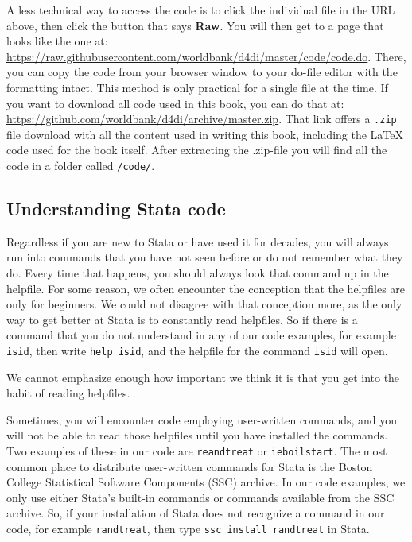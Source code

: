 A less technical way to access the code is to click the individual file in the URL above, then click
the button that says \textbf{Raw}. You will then get to a page that looks like the one at:
\url{https://raw.githubusercontent.com/worldbank/d4di/master/code/code.do}.
There, you can copy the code from your browser window to your do-file editor with the formatting intact.
This method is only practical for a single file at the time.
If you want to download all code used in this book, you can do that at:
\url{https://github.com/worldbank/d4di/archive/master.zip}. That link offers a \texttt{.zip} file download
with all the content used in writing this book, including the \LaTeX{} code used for the book itself. After
extracting the .zip-file you will find all the code in a folder called \texttt{/code/}.

\subsection{Understanding Stata code}

Regardless if you are new to Stata or have used it for decades, you will always run into commands that
you have not seen before or do not remember what they do. Every time that happens, you should always look
that command up in the helpfile. For some reason, we often encounter the conception that the helpfiles
are only for beginners. We could not disagree with that conception more, as the only way to get better at Stata
is to constantly read helpfiles. So if there is a command that you do not understand in any of our code
examples, for example \texttt{isid}, then write \texttt{help isid}, and the helpfile for the command \texttt{isid} will open.

We cannot emphasize enough how important we think it is that you get into the habit of reading helpfiles.

Sometimes, you will encounter code employing user-written commands,
and you will not be able to read those helpfiles until you have installed the commands.
Two examples of these in our code are \texttt{reandtreat} or \texttt{ieboilstart}.
The most common place to distribute user-written commands for Stata is the Boston College Statistical Software Components
(SSC) archive. In our code examples, we only use either Stata's built-in commands or commands available from the
SSC archive. So, if your installation of Stata does not recognize a command in our code, for example
\texttt{randtreat}, then type \texttt{ssc install randtreat} in Stata.

